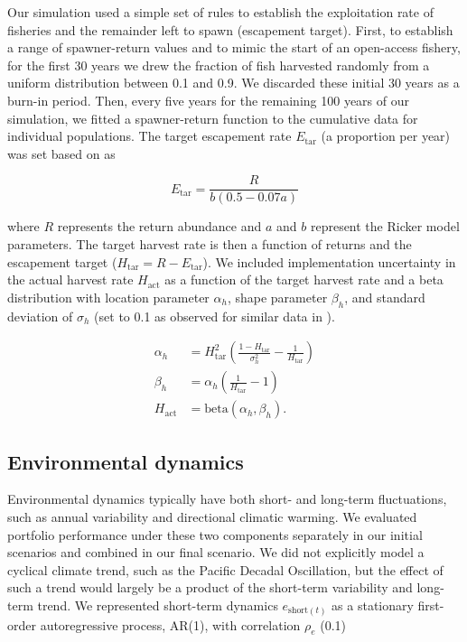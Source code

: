 Our simulation used a simple set of rules to establish the exploitation rate of fisheries and the remainder left to spawn (escapement target). First, to establish a range of spawner-return values and to mimic the start of an open-access fishery, for the first 30 years we drew the fraction of fish harvested randomly from a uniform distribution between 0.1 and 0.9. We discarded these initial 30 years as a burn-in period. Then, every five years for the remaining 100 years of our simulation, we fitted a spawner-return function to the cumulative data for individual populations. The target escapement rate $E_{\mathrm{tar}}$ (a proportion per year) was set based on \citet{hilborn1992} as

\[E_{\mathrm{tar}} = \frac{R}{b (0.5 - 0.07a)} \label{eq:esc}\]

\noindent
where $R$ represents the return abundance and $a$ and $b$ represent the Ricker model parameters. The target harvest rate is then a function of returns and the escapement target ($H_{\mathrm{tar}} = R - E_{\mathrm{tar}}$). We included implementation uncertainty in the actual harvest rate $H_{\mathrm{act}}$ as a function of the target harvest rate and a beta distribution with location parameter $\alpha_h$, shape parameter $\beta_h$, and standard deviation of $\sigma_h$ (set to 0.1 as observed for similar data in \citet{pestes2008}).

\[\begin{aligned}
\alpha_h &= H_{\mathrm{tar}}^2 \left( \frac{1 -
H_{\mathrm{tar}}}{\sigma_h^2} - \frac{1}{H_{\mathrm{tar}}} \right)\\ \beta_h
&= \alpha_h \left({\frac{1}{H_{\mathrm{tar}}} - 1}\right)\\
H_{\mathrm{act}} &= \mathrm{beta}(\alpha_h, \beta_h).
\end{aligned}\]

\subsection{Environmental dynamics}\label{environmental-dynamics}

Environmental dynamics typically have both short- and long-term fluctuations, such as annual variability and directional climatic warming. We evaluated portfolio performance under these two components separately in our initial scenarios and combined in our final scenario. We did not explicitly model a cyclical climate trend, such as the Pacific Decadal Oscillation, but the effect of such a trend would largely be a product of the short-term variability and long-term trend. We represented short-term dynamics $e_{\mathrm{short}(t)}$ as a stationary first-order autoregressive process, AR(1), with correlation $\rho_e$ (0.1)

